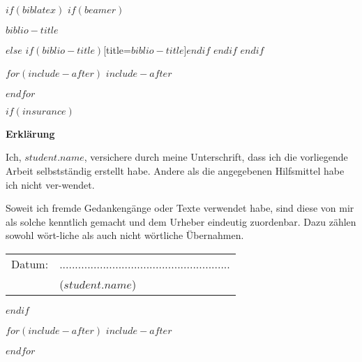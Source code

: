 \documentclass[
    12pt,
    a4paper,
    $if(lang)$
    $babel-lang$,
    $endif$
    bibliography=totocnumbered,
    listof=totocnumbered,
    toc=flat
]{scrartcl}
\def \studentname{$student.firstname$ $student.lastname$}
\def \studentname{$student.name$}
\begin{document}
$if(biblatex)$
    $if(beamer)$
\begin{frame}[allowframebreaks]{$biblio-title$}
  \bibliographytrue
  \printbibliography[heading=none]
\end{frame}
    $else$
\printbibliography$if(biblio-title)$[title=$biblio-title$]$endif$
    $endif$
$endif$

$for(include-after)$
$include-after$

$endfor$

$if(insurance)$
\newpage
\thispagestyle{empty}
\begin{center}
	\vspace*{5em}
	\huge\textbf{Erklärung}\\
\end{center}
\vspace{2em}
Ich, \studentname,  versichere  durch  meine  Unterschrift,  dass  ich  die  vorliegende Arbeit selbstständig erstellt habe. Andere als die angegebenen Hilfsmittel habe ich nicht ver-wendet. 

Soweit  ich  fremde  Gedankengänge  oder  Texte  verwendet  habe,  sind  diese  von  mir  als solche kenntlich gemacht und dem Urheber eindeutig zuordenbar. Dazu zählen sowohl wört-liche als auch nicht wörtliche Übernahmen.

\vspace{4em}
\begin{minipage}{\linewidth}
	\begin{tabular}{p{15em}p{15em}}
		Datum: &  .......................................................\\
		& \centering (\studentname)\\
	\end{tabular}
\end{minipage}
$endif$

$for(include-after)$
$include-after$

$endfor$
\end{document}
